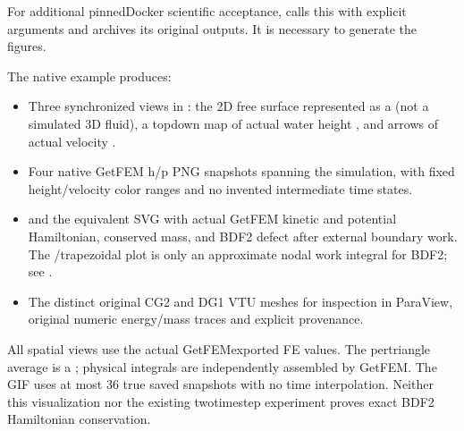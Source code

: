 \documentclass[letterpaper,10pt,english]{sphinxmanual}
\begin{document}
\sphinxAtStartPar
For additional pinned\sphinxhyphen{}Docker scientific acceptance,
 calls this
 with explicit arguments and archives its
original outputs. It is  necessary to generate the figures.

\sphinxAtStartPar
The native example produces:
\begin{itemize}
\item {} 
\sphinxAtStartPar
Three synchronized views in
:
the 2\sphinxhyphen{}D free surface represented as a  (not a simulated 3\sphinxhyphen{}D fluid),
a top\sphinxhyphen{}down map of actual water height
, and arrows of actual velocity
.

\item {} 
\sphinxAtStartPar
Four native GetFEM h/p PNG snapshots
spanning the simulation, with fixed
height/velocity color ranges and no
invented intermediate time states.

\item {} 
\sphinxAtStartPar
{}
and the equivalent SVG with actual
GetFEM kinetic and potential Hamiltonian,
conserved mass, and  BDF2
defect after external boundary work. The
 /trapezoidal
plot is only an approximate nodal work integral
for BDF2; see {\hyperref[\detokenize{energy_and_power::doc}]{}}.

\item {} 
\sphinxAtStartPar
The distinct original CG2  and DG1
 VTU meshes for inspection in ParaView,
original numeric energy/mass traces and
explicit provenance.

\end{itemize}

\sphinxAtStartPar
All spatial views use the actual
GetFEM\sphinxhyphen{}exported FE values. The per\sphinxhyphen{}triangle
average is a ;
physical integrals are independently assembled
by GetFEM. The GIF uses at most 36 true
saved snapshots with no time interpolation.
Neither this visualization nor the existing
two\sphinxhyphen{}time\sphinxhyphen{}step experiment proves exact
BDF2 Hamiltonian conservation.
\end{document}
